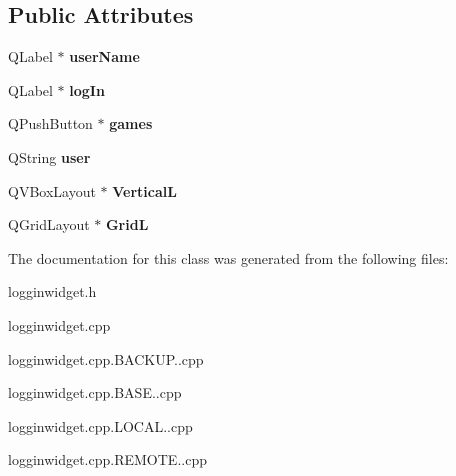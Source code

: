 \subsection*{Public Attributes}
\begin{DoxyCompactItemize}
\item 
\hypertarget{classloggInWidget_a993b2cb5c5a849fbd52247c73217f0e4}{Q\-Label $\ast$ {\bfseries user\-Name}}\label{classloggInWidget_a993b2cb5c5a849fbd52247c73217f0e4}

\item 
\hypertarget{classloggInWidget_a3a96d17dbd0ef6c867bd9e974cd1e099}{Q\-Label $\ast$ {\bfseries log\-In}}\label{classloggInWidget_a3a96d17dbd0ef6c867bd9e974cd1e099}

\item 
\hypertarget{classloggInWidget_a51725943ce38347537ad933b0d12a456}{Q\-Push\-Button $\ast$ {\bfseries games}}\label{classloggInWidget_a51725943ce38347537ad933b0d12a456}

\item 
\hypertarget{classloggInWidget_a4acf8b02bcc79d610be1211d142fe7e0}{Q\-String {\bfseries user}}\label{classloggInWidget_a4acf8b02bcc79d610be1211d142fe7e0}

\item 
\hypertarget{classloggInWidget_a57d62601628a5766a2f910ddd7f945f8}{Q\-V\-Box\-Layout $\ast$ {\bfseries Vertical\-L}}\label{classloggInWidget_a57d62601628a5766a2f910ddd7f945f8}

\item 
\hypertarget{classloggInWidget_a605b4324830843e3f51201dcec9bd042}{Q\-Grid\-Layout $\ast$ {\bfseries Grid\-L}}\label{classloggInWidget_a605b4324830843e3f51201dcec9bd042}

\end{DoxyCompactItemize}


The documentation for this class was generated from the following files\-:\begin{DoxyCompactItemize}
\item 
logginwidget.\-h\item 
logginwidget.\-cpp\item 
logginwidget.\-cpp.\-B\-A\-C\-K\-U\-P..\-cpp\item 
logginwidget.\-cpp.\-B\-A\-S\-E..\-cpp\item 
logginwidget.\-cpp.\-L\-O\-C\-A\-L..\-cpp\item 
logginwidget.\-cpp.\-R\-E\-M\-O\-T\-E..\-cpp\end{DoxyCompactItemize}
